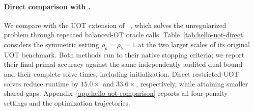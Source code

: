 \paragraph{Direct comparison with \hellouot.}
We compare with the UOT extension of \hello~\citep{xia2026dual}, which solves the unregularized problem through repeated balanced-OT oracle calls.
Table~\ref{tab:hello-uot-direct} considers the symmetric setting $\rho_a=\rho_b=1$ at the two larger scales of its original UOT benchmark.
Both methods run to their native stopping criteria; we report their final primal accuracy against the same independently audited dual bound and their complete solve times, including initialization.
Direct restricted-UOT solves reduce runtime by $15.0\times$ and $33.6\times$, respectively, while attaining smaller shared gaps.
Appendix~\ref{app:hello-uot-comparison} reports all four penalty settings and the optimization trajectories.

